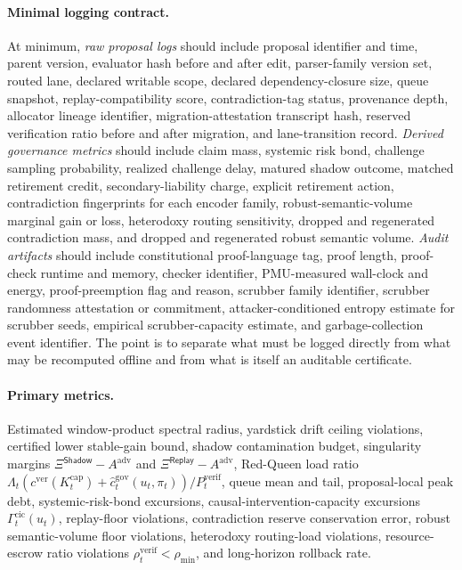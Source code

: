 \documentclass[11pt]{article}
\theoremstyle{definition}
\newcommand{\1}{\mathbf{1}}
\newcommand{\Shadow}{\mathsf{Shadow}}
\newcommand{\Replay}{\mathsf{Replay}}
\begin{document}
\paragraph{Minimal logging contract.} At minimum, \emph{raw proposal logs} should include proposal identifier and time, parent version, evaluator hash before and after edit, parser-family version set, routed lane, declared writable scope, declared dependency-closure size, queue snapshot, replay-compatibility score, contradiction-tag status, provenance depth, allocator lineage identifier, migration-attestation transcript hash, reserved verification ratio before and after migration, and lane-transition record. \emph{Derived governance metrics} should include claim mass, systemic risk bond, challenge sampling probability, realized challenge delay, matured shadow outcome, matched retirement credit, secondary-liability charge, explicit retirement action, contradiction fingerprints for each encoder family, robust-semantic-volume marginal gain or loss, heterodoxy routing sensitivity, dropped and regenerated contradiction mass, and dropped and regenerated robust semantic volume. \emph{Audit artifacts} should include constitutional proof-language tag, proof length, proof-check runtime and memory, checker identifier, PMU-measured wall-clock and energy, proof-preemption flag and reason, scrubber family identifier, scrubber randomness attestation or commitment, attacker-conditioned entropy estimate for scrubber seeds, empirical scrubber-capacity estimate, and garbage-collection event identifier. The point is to separate what must be logged directly from what may be recomputed offline and from what is itself an auditable certificate.

\paragraph{Primary metrics.} Estimated window-product spectral radius, yardstick drift ceiling violations, certified lower stable-gain bound, shadow contamination budget, singularity margins $\Xi^{\Shadow}-A^{\mathrm{adv}}$ and $\Xi^{\Replay}-A^{\mathrm{adv}}$, Red-Queen load ratio $\Lambda_t(c^{\mathrm{ver}}(K_t^{\mathrm{cap}})+\widehat c_t^{\mathrm{gov}}(u_t,\pi_t))/P_t^{\mathrm{verif}}$, queue mean and tail, proposal-local peak debt, systemic-risk-bond excursions, causal-intervention-capacity excursions $\Gamma_t^{\mathrm{cic}}(u_t)$, replay-floor violations, contradiction reserve conservation error, robust semantic-volume floor violations, heterodoxy routing-load violations, resource-escrow ratio violations $\rho_t^{\mathrm{verif}}<\rho_{\min}$, and long-horizon rollback rate.
\end{document}
